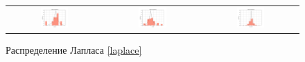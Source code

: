 \documentclass[a4paper,14pt]{article}
\begin{document}
	\begin{figure}[H]
		\centering
		\begin{tabular}{c c c}
			\includegraphics[height = 0.25\textheight, width = 0.31\textwidth]{../image/lab1/lab1_laplace_10.png}
			& \includegraphics[height = 0.25\textheight, width = 0.31\textwidth]{../image/lab1/lab1_laplace_50.png}
			& \includegraphics[height = 0.25\textheight, width = 0.31\textwidth]{../image/lab1/lab1_laplace_1000.png}
		\end{tabular}
		\caption{Распределение Лапласа \eqref{laplace}}
		\label{fig:laplace}
	\end{figure}
	
\end{document}
